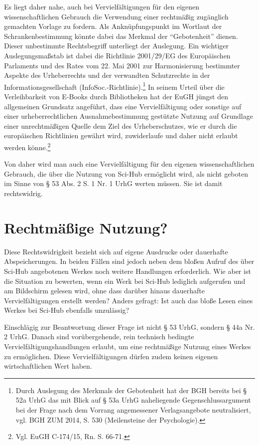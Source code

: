 \documentclass[a4paper,
fontsize=11pt,
oneside,
numbers=noperiodatend,
parskip=half-,
bibliography=totoc,
final
]{scrartcl}
\begin{document}
Es liegt daher nahe, auch bei Vervielfältigungen für den eigenen
wissenschaftlichen Gebrauch die Verwendung einer rechtmäßig zugänglich
gemachten Vorlage zu fordern. Als Anknüpfungspunkt im Wortlaut der
Schrankenbestimmung könnte dabei das Merkmal der \enquote{Gebotenheit}
dienen. Dieser unbestimmte Rechtsbegriff unterliegt der Auslegung. Ein
wichtiger Auslegungsmaßstab ist dabei die Richtlinie 2001/29/EG des
Europäischen Parlaments und des Rates vom 22. Mai 2001 zur
Harmonisierung bestimmter Aspekte des Urheberrechts und der verwandten
Schutzrechte in der Informationsgesellschaft
(InfoSoc.-Richtlinie).\footnote{Durch Auslegung des Merkmals der
  Gebotenheit hat der BGH bereits bei § 52a UrhG das mit Blick auf § 53a
  UrhG naheliegende Gegenschlussargument bei der Frage nach dem Vorrang
  angemessener Verlagsangebote neutralisiert, vgl. BGH ZUM 2014, S. 530
  (Meilensteine der Psychologie).} In seinem Urteil über die
Verleihbarkeit von E-Books durch Bibliotheken hat der EuGH jüngst den
allgemeinen Grundsatz angeführt, dass eine Vervielfältigung oder
sonstige auf einer urheberrechtlichen Ausnahmebestimmung gestützte
Nutzung auf Grundlage einer unrechtmäßigen Quelle dem Ziel des
Urheberschutzes, wie er durch die europäischen Richtlinien gewährt wird,
zuwiderlaufe und daher nicht erlaubt werden könne.\footnote{Vgl. EuGH
  C-174/15, Rn. S. 66-71.}

Von daher wird man auch eine Vervielfältigung für den eigenen
wissenschaftlichen Gebrauch, die über die Nutzung von Sci-Hub ermöglicht
wird, als nicht geboten im Sinne von § 53 Abs. 2 S. 1 Nr. 1 UrhG werten
müssen. Sie ist damit rechtswidrig.

\section*{Rechtmäßige Nutzung?}\label{rechtmuxe4uxdfige-nutzung}

Diese Rechtswidrigkeit bezieht sich auf eigene Ausdrucke oder dauerhafte
Abspeicherungen. In beiden Fällen sind jedoch neben dem bloßen Aufruf
des über Sci-Hub angebotenen Werkes noch weitere Handlungen
erforderlich. Wie aber ist die Situation zu bewerten, wenn ein Werk bei
Sci-Hub lediglich aufgerufen und am Bild­schirm gelesen wird, ohne dass
darüber hinaus dauerhafte Vervielfältigungen erstellt werden? Anders
gefragt: Ist auch das bloße Lesen eines Werkes bei Sci-Hub ebenfalls
unzulässig?

Einschlägig zur Beantwortung dieser Frage ist nicht § 53 UrhG, sondern §
44a Nr. 2 UrhG. Danach sind vorübergehende, rein technisch bedingte
Vervielfältigungshandlungen erlaubt, um eine rechtmäßige Nutzung eines
Werkes zu ermöglichen. Diese Vervielfältigungen dürfen zudem keinen
eigenen wirtschaftlichen Wert haben.
\end{document}
